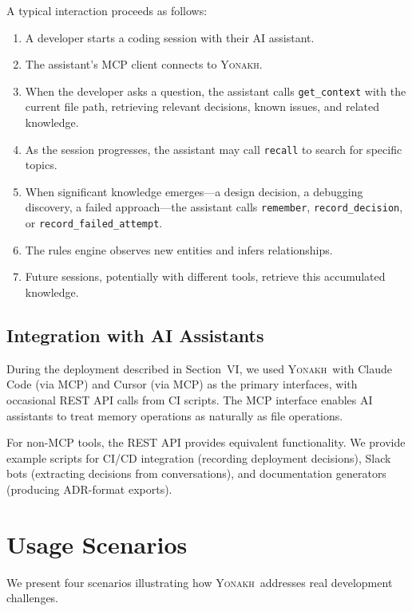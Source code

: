 \documentclass[10pt,journal,compsoc]{IEEEtran}
\newcommand{\yonakh}{\textsc{Yonakh}}
\begin{document}
A typical interaction proceeds as follows:

\begin{enumerate}
\item A developer starts a coding session with their AI assistant.
\item The assistant's MCP client connects to \yonakh.
\item When the developer asks a question, the assistant calls \texttt{get\_context} with the current file path, retrieving relevant decisions, known issues, and related knowledge.
\item As the session progresses, the assistant may call \texttt{recall} to search for specific topics.
\item When significant knowledge emerges---a design decision, a debugging discovery, a failed approach---the assistant calls \texttt{remember}, \texttt{record\_decision}, or \texttt{record\_failed\_attempt}.
\item The rules engine observes new entities and infers relationships.
\item Future sessions, potentially with different tools, retrieve this accumulated knowledge.
\end{enumerate}

\subsection{Integration with AI Assistants}

During the deployment described in Section~VI, we used \yonakh\ with Claude Code (via MCP) and Cursor (via MCP) as the primary interfaces, with occasional REST API calls from CI scripts. The MCP interface enables AI assistants to treat memory operations as naturally as file operations.

For non-MCP tools, the REST API provides equivalent functionality. We provide example scripts for CI/CD integration (recording deployment decisions), Slack bots (extracting decisions from conversations), and documentation generators (producing ADR-format exports).

\section{Usage Scenarios}

We present four scenarios illustrating how \yonakh\ addresses real development challenges.
\end{document}

